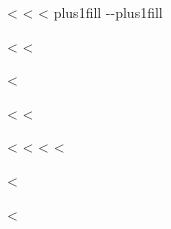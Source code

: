 \documentclass[letterpaper,10pt,english]{sphinxmanual}
\begin{document}
\begin{savenotes}
\begin{savenotes}
\begin{savenotes}
\begin{savenotes}
\begin{fulllineitems}
{{\begin{savenotes}<%
<%
\sphinxthistablewithglobalstyle
\sphinxthistablewithnovlinesstyle
<%
  \LTleft \@totalleftmargin plus1fill
  \LTright\dimexpr\columnwidth-\@totalleftmargin-\linewidth\relax plus1fill
\makeatother
\begin{longtable}{}<%
\sphinxtoprule
<%
\hline

<%

<%
    \makebox[0pt]<%
{\makebox[0pt]<%
<%
<%
<%

<%

<%
\multicolumn{2}{r}{<%
    <%
<%
\endfoot

\endlastfoot<%
\sphinxtableatstartofbodyhook<%
\begin{varwidth}[t]{\sphinxcolwidth{1}{2}}
<%


\end{varwidth}}}
\end{longtable}
\end{savenotes}}}
\end{fulllineitems}
\end{savenotes}
\end{savenotes}
\end{savenotes}
\end{savenotes}
\end{document}
